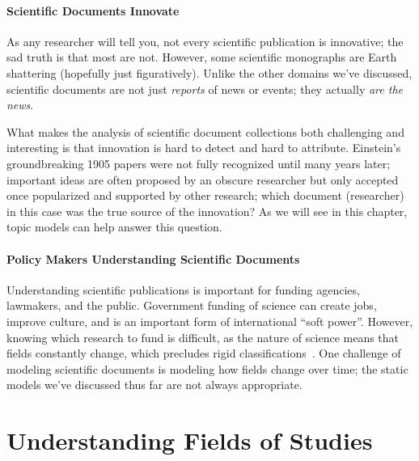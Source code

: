 \paragraph{Scientific Documents Innovate}

As any researcher will tell you, not every scientific publication is innovative;
the sad truth is that most are not.  However, some scientific monographs are
Earth shattering (hopefully just figuratively).  Unlike the other domains we've
discussed, scientific documents are not just \emph{reports} of news or events;
they actually \emph{are the news}.

What makes the analysis of scientific document collections both challenging and
interesting is that innovation is hard to detect and hard to attribute.
Einstein's groundbreaking 1905 papers were not fully recognized until many years
later; important ideas are often proposed by an obscure researcher but only accepted
once popularized and supported by other research; which document (researcher)
in this case was the true source of the innovation?  As we will see in this
chapter, topic models can help answer this question.

\paragraph{Policy Makers Understanding Scientific Documents}

Understanding scientific publications is important for funding agencies,
lawmakers, and the public.  Government funding of science can create jobs,
improve culture, and is an important form of international ``soft power''.
However, knowing which research to fund is difficult, as the nature of science
means that fields constantly change, which precludes rigid
classifications~\citep{szostak-04}.  One challenge of modeling scientific
documents is modeling how fields change over time; the static models we've
discussed thus far are not always appropriate.

\section{Understanding Fields of Studies}
\label{sec:sci_fields}


